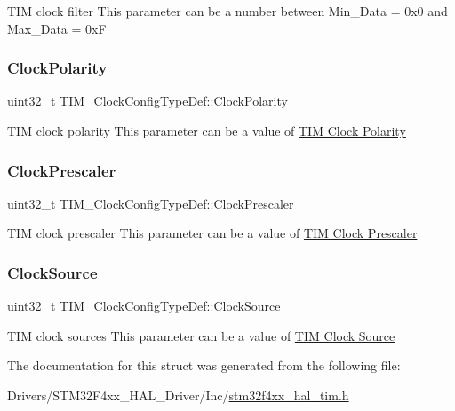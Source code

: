 T\+IM clock filter This parameter can be a number between Min\+\_\+\+Data = 0x0 and Max\+\_\+\+Data = 0xF \mbox{\label{struct_t_i_m___clock_config_type_def_a66453fa8dc8a300267ff5aba08eff5c4}} 
\subsubsection{\texorpdfstring{Clock\+Polarity}{ClockPolarity}}
{\footnotesize\ttfamily uint32\+\_\+t T\+I\+M\+\_\+\+Clock\+Config\+Type\+Def\+::\+Clock\+Polarity}

T\+IM clock polarity This parameter can be a value of \hyperlink{group___t_i_m___clock___polarity}{T\+IM Clock Polarity} \mbox{\label{struct_t_i_m___clock_config_type_def_ae4c0cb6f58da0ec7b99f1c6411d2fee1}} 
\subsubsection{\texorpdfstring{Clock\+Prescaler}{ClockPrescaler}}
{\footnotesize\ttfamily uint32\+\_\+t T\+I\+M\+\_\+\+Clock\+Config\+Type\+Def\+::\+Clock\+Prescaler}

T\+IM clock prescaler This parameter can be a value of \hyperlink{group___t_i_m___clock___prescaler}{T\+IM Clock Prescaler} \mbox{\label{struct_t_i_m___clock_config_type_def_a54c329013b5f6f87d1c3d2495fca84d2}} 
\subsubsection{\texorpdfstring{Clock\+Source}{ClockSource}}
{\footnotesize\ttfamily uint32\+\_\+t T\+I\+M\+\_\+\+Clock\+Config\+Type\+Def\+::\+Clock\+Source}

T\+IM clock sources This parameter can be a value of \hyperlink{group___t_i_m___clock___source}{T\+IM Clock Source} 

The documentation for this struct was generated from the following file\+:\begin{DoxyCompactItemize}
\item 
Drivers/\+S\+T\+M32\+F4xx\+\_\+\+H\+A\+L\+\_\+\+Driver/\+Inc/\hyperlink{stm32f4xx__hal__tim_8h}{stm32f4xx\+\_\+hal\+\_\+tim.\+h}\end{DoxyCompactItemize}
